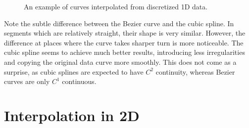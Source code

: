 \documentclass[a4paper,10pt]{report}
\begin{document}
\begin{figure}[H]
\begin{subfigure}{0.39\textwidth}
    \end{subfigure}
    \caption{An example of curves interpolated from discretized 1D data.}
    \label{fig:1D_fun_interpolated}
\end{figure}

Note the subtle difference between the Bezier curve and the cubic spline. In segments which are relatively straight, their shape is very similar. However, the difference at places where the curve takes sharper turn is more noticeable. The cubic spline seems to achieve much better results, introducing less irregularities and copying the original data curve more smoothly. This does not come as a surprise, as cubic splines are expected to have \textit{$C^2$} continuity, whereas Bezier curves are only \textit{$C^1$} continuous.

\chapter{Interpolation in 2D}
\end{document}
